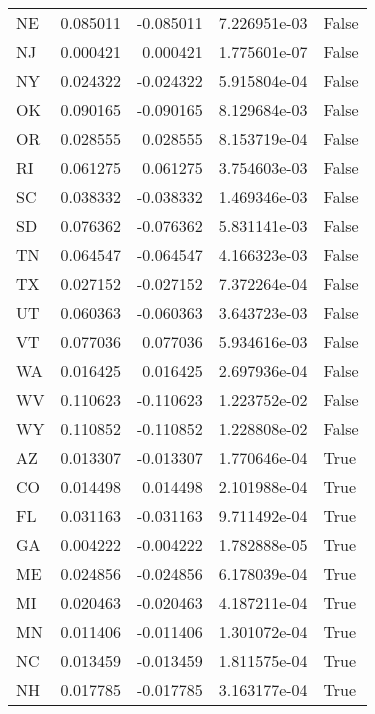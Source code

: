 \begin{table}
\begin{tabular}{lrrrl}
      NE &   0.085011 & -0.085011 &   7.226951e-03 &         False \\
      NJ &   0.000421 &  0.000421 &   1.775601e-07 &         False \\
      NY &   0.024322 & -0.024322 &   5.915804e-04 &         False \\
      OK &   0.090165 & -0.090165 &   8.129684e-03 &         False \\
      OR &   0.028555 &  0.028555 &   8.153719e-04 &         False \\
      RI &   0.061275 &  0.061275 &   3.754603e-03 &         False \\
      SC &   0.038332 & -0.038332 &   1.469346e-03 &         False \\
      SD &   0.076362 & -0.076362 &   5.831141e-03 &         False \\
      TN &   0.064547 & -0.064547 &   4.166323e-03 &         False \\
      TX &   0.027152 & -0.027152 &   7.372264e-04 &         False \\
      UT &   0.060363 & -0.060363 &   3.643723e-03 &         False \\
      VT &   0.077036 &  0.077036 &   5.934616e-03 &         False \\
      WA &   0.016425 &  0.016425 &   2.697936e-04 &         False \\
      WV &   0.110623 & -0.110623 &   1.223752e-02 &         False \\
      WY &   0.110852 & -0.110852 &   1.228808e-02 &         False \\
      AZ &   0.013307 & -0.013307 &   1.770646e-04 &          True \\
      CO &   0.014498 &  0.014498 &   2.101988e-04 &          True \\
      FL &   0.031163 & -0.031163 &   9.711492e-04 &          True \\
      GA &   0.004222 & -0.004222 &   1.782888e-05 &          True \\
      ME &   0.024856 & -0.024856 &   6.178039e-04 &          True \\
      MI &   0.020463 & -0.020463 &   4.187211e-04 &          True \\
      MN &   0.011406 & -0.011406 &   1.301072e-04 &          True \\
      NC &   0.013459 & -0.013459 &   1.811575e-04 &          True \\
      NH &   0.017785 & -0.017785 &   3.163177e-04 &          True \\

\end{tabular}
\end{table}
